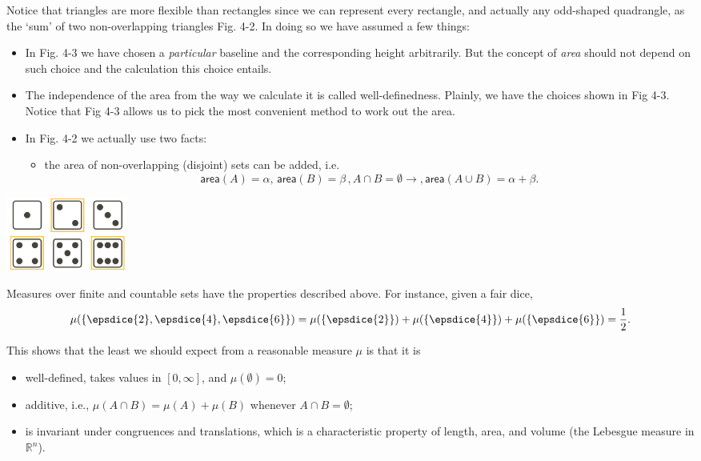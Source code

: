 \documentclass{tufte-handout}
\begin{document}
Notice that triangles are more flexible than rectangles since we can represent
every rectangle, and actually any odd-shaped quadrangle, as the `sum'
of two non-overlapping triangles Fig. 4-2. In doing so we have assumed a few things:
\begin{itemize}
\item In Fig. 4-3 we have chosen a \textit{particular} baseline and the corresponding height 
arbitrarily. But the concept of \textit{area} should not depend on such choice and the
calculation this choice entails. 
\item The independence of the area from the way we calculate it is called well-definedness.
Plainly, we have the choices shown in Fig 4-3. Notice that Fig 4-3 allows us to pick the most convenient method
to work out the area. 
\item In Fig. 4-2 we actually use two facts:
\begin{itemize}
\item the area of non-overlapping (disjoint) sets can be added, i.e.
\begin{equation*}
\textsf{area}(A) = \alpha,\, \textsf{area}(B) = \beta\,, A\cap B = \emptyset \rightarrow, \textsf{area}(A\cup B) = \alpha + \beta.
\end{equation*}
\end{itemize}
\end{itemize}
\begin{marginfigure}
\centering
\includegraphics[width=4cm]{fig/dice.png}
\caption{Measures over finite and countable sets have the properties described above. For instance, given a fair dice, $$\mu(\{\epsdice{2},\epsdice{4},\epsdice{6}\})= \mu(\{\epsdice{2}\})+ \mu(\{\epsdice{4}\}) +\mu(\{\epsdice{6}\}) = \frac{1}{2}.$$
}
\end{marginfigure}
This shows that the least we should expect from a reasonable measure $\mu$ is that it is
\begin{itemize}
\item well-defined, takes values in $[0,\infty]$, and $\mu(\emptyset)=0$;
\item additive, i.e., $\mu(A \cap B) = \mu(A) + \mu(B)$ whenever $A\cap B = \emptyset$; 
\item is invariant under congruences and translations, which is a characteristic property of length, area, and volume (the Lebesgue measure in $\mathbb R^n$).
\end{itemize}
\end{document}
